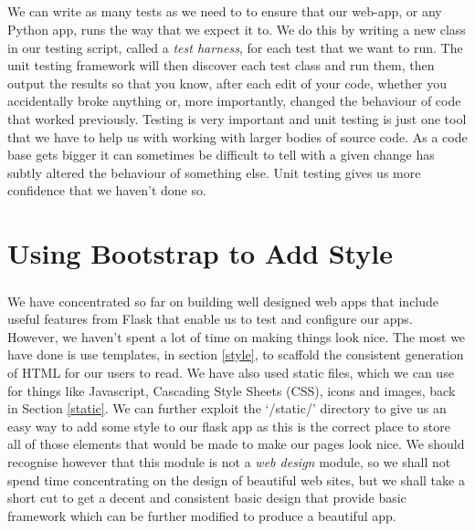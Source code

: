 \documentclass[12pt, a4paper, twoside]{book}
\begin{document}
\paragraph{} We can write as many tests as we need to to ensure that our web-app, or any Python app, runs the way that we expect it to. We do this by writing a new class in our testing script, called a \emph{test harness}, for each test that we want to run. The unit testing framework will then discover each test class and run them, then output the results so that you know, after each edit of your code, whether you accidentally broke anything or, more importantly, changed the behaviour of code that worked previously. Testing is very important and unit testing is just one tool that we have to help us with working with larger bodies of source code. As a code base gets bigger it can sometimes be difficult to tell with a given change has subtly altered the behaviour of something else. Unit testing gives us more confidence that we haven't done so.



\chapter{Using Bootstrap to Add Style}
\label{lab07}
\paragraph{} We have concentrated so far on building well designed web apps that include useful features from Flask that enable us to test and configure our apps. However, we haven't spent a lot of time on making things look nice. The most we have done is use templates, in section \ref{style}, to scaffold the consistent generation of HTML for our users to read. We have also used static files, which we can use for things like Javascript, Cascading Style Sheets (CSS), icons and images, back in Section \ref{static}. We can further exploit the `/static/' directory to give us an easy way to add some style to our flask app as this is the correct place to store all of those elements that would be made to make our pages look nice. We should recognise however that this module is not a \emph{web design} module, so we shall not spend time concentrating on the design of beautiful web sites, but we shall take a short cut to get a decent and consistent basic design that provide basic framework which can be further modified to produce a beautiful app.
\end{document}
